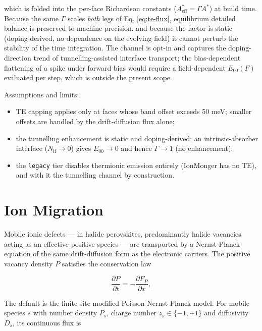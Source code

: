 \documentclass[
  11pt,
  american,
]{report}
\providecommand{\tightlist}{%
  \setlength{\itemsep}{0pt}\setlength{\parskip}{0pt}}
\begin{document}
which is folded into the per-face Richardson constants
(\(A^{*}_{\mathrm{eff}} = \Gamma A^{*}\)) at build time. Because the
same \(\Gamma\) scales \emph{both} legs of Eq. \ref{eq:te-flux},
equilibrium detailed balance is preserved to machine precision, and
because the factor is static (doping-derived, no dependence on the
evolving field) it cannot perturb the stability of the time integration.
The channel is opt-in and captures the doping-direction trend of
tunnelling-assisted interface transport; the bias-dependent flattening
of a spike under forward bias would require a field-dependent
\(E_{00}(F)\) evaluated per step, which is outside the present scope.

Assumptions and limits:

\begin{itemize}
\tightlist
\item
  TE capping applies only at faces whose band offset exceeds 50 meV;
  smaller offsets are handled by the drift-diffusion flux alone;
\item
  the tunnelling enhancement is static and doping-derived; an
  intrinsic-absorber interface (\(N_{\mathrm{if}}\!\to\!0\)) gives
  \(E_{00}\!\to\!0\) and hence \(\Gamma\!\to\!1\) (no enhancement);
\item
  the \texttt{legacy} tier disables thermionic emission entirely
  (IonMonger has no TE), and with it the tunnelling channel by
  construction.
\end{itemize}

\hypertarget{ion-migration}{%
\section{Ion Migration}\label{ion-migration}}

Mobile ionic defects --- in halide perovskites, predominantly halide
vacancies acting as an effective positive species --- are transported by
a Nernst-Planck equation of the same drift-diffusion form as the
electronic carriers. The positive vacancy density \(P\) satisfies the
conservation law

\begin{equation}
\label{eq:ion-continuity}
\frac{\partial P}{\partial t}
=
-\frac{\partial F_P}{\partial x},
\end{equation}

The default is the finite-site modified Poisson-Nernst-Planck model. For
mobile species \(s\) with number density \(P_s\), charge number
\(z_s\in\{-1,+1\}\) and diffusivity \(D_s\), its continuous flux is
\end{document}
